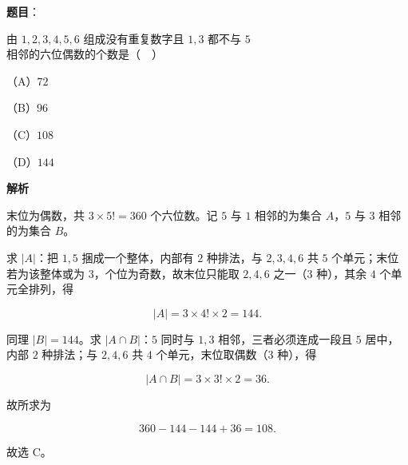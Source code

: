 \begin{answer}

\textbf{题目}：

由 $1,2,3,4,5,6$ 组成没有重复数字且 $1,3$ 都不与 $5$ 相邻的六位偶数的个数是（　）

（A）$72$

（B）$96$

（C）$108$

（D）$144$

\textbf{解析}

末位为偶数，共 $3\times5!=360$ 个六位数。记 $5$ 与 $1$ 相邻的为集合 $A$，$5$ 与 $3$ 相邻的为集合 $B$。

求 $|A|$：把 $1,5$ 捆成一个整体，内部有 $2$ 种排法，与 $2,3,4,6$ 共 $5$ 个单元；末位若为该整体或为 $3$，个位为奇数，故末位只能取 $2,4,6$ 之一（$3$ 种），其余 $4$ 个单元全排列，得

\nopagebreak[4]
\[|A|=3\times4!\times2=144.\]

同理 $|B|=144$。求 $|A\cap B|$：$5$ 同时与 $1,3$ 相邻，三者必须连成一段且 $5$ 居中，内部 $2$ 种排法；与 $2,4,6$ 共 $4$ 个单元，末位取偶数（$3$ 种），得

\nopagebreak[4]
\[|A\cap B|=3\times3!\times2=36.\]

故所求为

\nopagebreak[4]
\[360-144-144+36=108.\]

故选 C。


\end{answer}
